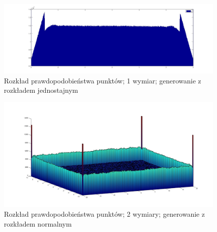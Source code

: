 \documentclass{mini}
\begin{document}
\begin{figure}[H]
\centering
\includegraphics[width=\textwidth]{p_j_100M_1__3_3}
\caption{Rozkład prawdopodobieństwa punktów; 1 wymiar; generowanie z rozkładem jednostajnym}
\label{bladzenie:rzutowanie1dj}
\end{figure}

\begin{figure}[H]
\centering
\includegraphics[width=\textwidth]{p_n_10M_2__20_20__10_10_4_2}
\caption{Rozkład prawdopodobieństwa punktów; 2 wymiary; generowanie z rozkładem normalnym}
\label{bladzenie:rzutowanie2d}
\end{figure}
\end{document}
